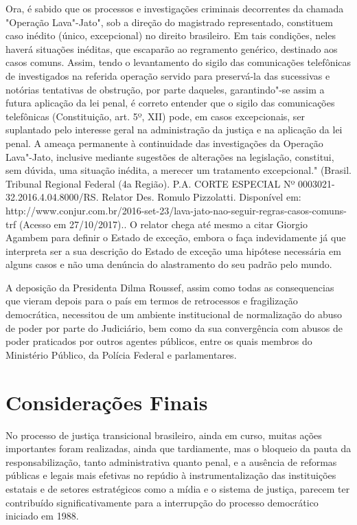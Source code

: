 {  Ora, é sabido que os processos e investigações criminais decorrentes
  da chamada "Operação Lava"-Jato", sob a direção do magistrado
  representado, constituem caso inédito (único, excepcional) no direito
  brasileiro. Em tais condições, neles haverá situações inéditas, que
  escaparão ao regramento genérico, destinado aos casos comuns. Assim,
  tendo o levantamento do sigilo das comunicações telefônicas de
  investigados na referida operação servido para preservá-la das
  sucessivas e notórias tentativas de obstrução, por parte daqueles,
  garantindo"-se assim a futura aplicação da lei penal, é correto
  entender que o sigilo das comunicações telefônicas (Constituição, art.
  5º, XII) pode, em casos excepcionais, ser suplantado pelo interesse
  geral na administração da justiça e na aplicação da lei penal. A
  ameaça permanente à continuidade das investigações da Operação
  Lava"-Jato, inclusive mediante sugestões de alterações na legislação,
  constitui, sem dúvida, uma situação inédita, a merecer um tratamento
  excepcional." (Brasil. Tribunal Regional Federal (4a Região). P.A.
  CORTE ESPECIAL Nº 0003021-32.2016.4.04.8000/RS. Relator Des. Romulo
  Pizzolatti. Disponível em:
  http://www.conjur.com.br/2016-set-23/lava-jato-nao-seguir-regras-casos-comuns-trf
  (Acesso em 27/10/2017).}. O relator chega até mesmo a citar Giorgio
Agambem para definir o Estado de exceção, embora o faça indevidamente já
que interpreta ser a sua descrição do Estado de exceção uma hipótese
necessária em alguns casos e não uma denúncia do alastramento do seu
padrão pelo mundo.

A deposição da Presidenta Dilma Roussef, assim como todas as
consequencias que vieram depois para o país em termos de retrocessos e
fragilização democrática, necessitou de um ambiente institucional de
normalização do abuso de poder por parte do Judiciário, bem como da sua
convergência com abusos de poder praticados por outros agentes públicos,
entre os quais membros do Ministério Público, da Polícia Federal e
parlamentares.

\section{Considerações Finais}

No processo de justiça transicional brasileiro, ainda em curso, muitas
ações importantes foram realizadas, ainda que tardiamente, mas o
bloqueio da pauta da responsabilização, tanto administrativa quanto
penal, e a ausência de reformas públicas e legais mais efetivas no
repúdio à instrumentalização das instituições estatais e de setores
estratégicos como a mídia e o sistema de justiça, parecem ter
contribuído significativamente para a interrupção do processo
democrático iniciado em 1988.

